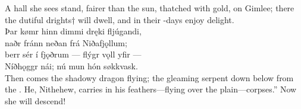\bvb A hall she sees stand, fairer than the sun, thatched with gold, on Gimlee; there the dutiful drights† will dwell, and in their -days enjoy delight.\\%

\bva Þar kømr hinn dimmi \hld dręki fljúgandi, \\%
naðr fránn neðan \hld frá Niðafjǫllum; \\%
berr sér í fjǫðrum \hld — flýgr vǫll yfir — \\%
Níðhǫggr nái; \hld nú mun hón søkkvask.\\%

\bvb Then comes the shadowy dragon flying; the gleaming serpent down below from the . He, Nithehew, carries in his feathers—flying over the plain—corpses.” Now she will descend!\footnotemark[1]\\%
